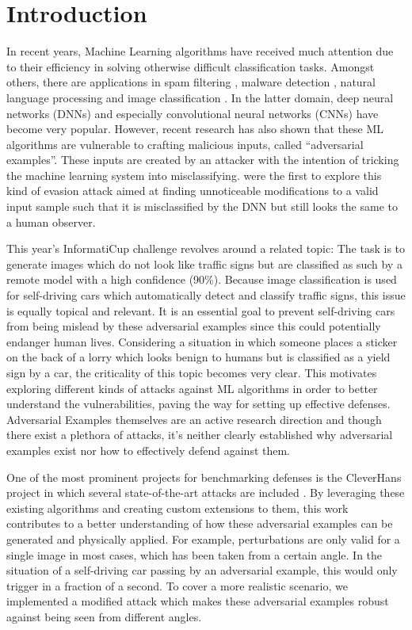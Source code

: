 \section{Introduction}

In recent years, Machine Learning algorithms have received much attention due to their efficiency in solving otherwise difficult classification tasks.
Amongst others, there are applications in spam filtering \cite{ruan2010three, clark2003neural}, malware detection \cite{dahl2013large}, natural language processing \cite{collobert2008unified} and image classification \cite{simonyan2014very, he2016deep}.
In the latter domain, deep neural networks (DNNs) and especially convolutional neural networks (CNNs) have become very popular.
However, recent research has also shown that these ML algorithms are vulnerable to crafting malicious inputs, called \enquote{adversarial examples}.
These inputs are created by an attacker with the intention of tricking the machine learning system into misclassifying.
\citet{szegedy2013intriguing} were the first to explore this kind of evasion attack aimed at finding unnoticeable modifications to a valid input sample such that it is misclassified by the DNN but still looks the same to a human observer.

This year's InformatiCup challenge revolves around a related topic: The task is to generate images which do not look like traffic signs but are classified as such by a remote model with a high confidence (90\%).
Because image classification is used for self-driving cars which automatically detect and classify traffic signs, this issue is equally topical and relevant.
It is an essential goal to prevent self-driving cars from being mislead by these adversarial examples since this could potentially endanger human lives.
Considering a situation in which someone places a sticker on the back of a lorry which looks benign to humans but is classified as a yield sign by a car, the criticality of this topic becomes very clear.
This motivates exploring different kinds of attacks against ML algorithms in order to better understand the vulnerabilities, paving the way for setting up effective defenses.
Adversarial Examples themselves are an active research direction and though there exist a plethora of attacks, it's neither clearly established why adversarial examples exist nor how to effectively defend against them.

One of the most prominent projects for benchmarking defenses is the CleverHans project in which several state-of-the-art attacks are included \cite{papernot2016cleverhans}.
By leveraging these existing algorithms and creating custom extensions to them, this work contributes to a better understanding of how these adversarial examples can be generated and physically applied.
For example, perturbations are only valid for a single image in most cases, which has been taken from a certain angle.
In the situation of a self-driving car passing by an adversarial example, this would only trigger in a fraction of a second.
To cover a more realistic scenario, we implemented a modified attack which makes these adversarial examples robust against being seen from different angles.

